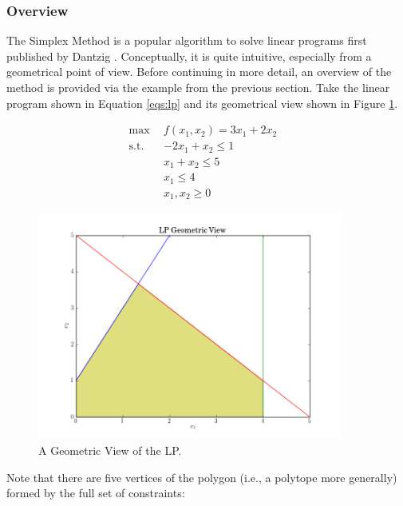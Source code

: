 \subsubsection{Overview}
The Simplex Method is a popular algorithm to solve linear programs first
published by Dantzig \cite{dantzig_maximization_1951}. Conceptually, it is quite
intuitive, especially from a geometrical point of view. Before continuing in
more detail, an overview of the method is provided via the example from the
previous section. Take the linear program shown in Equation \ref{eqs:lp} and its
geometrical view shown in Figure \ref{fig:geometric}.

\begin{subequations}\label{eqs:lp}
  \begin{align}
    \max \:\: & 
    f(x_1, x_2) = 3 x_1 + 2 x_2
    & \label{eqs:lp_obj} \\
    \text{s.t.} \:\: &
    -2 x_1 + x_2 \leq 1 \\
    &
    x_1 + x_2 \leq 5 
    & \label{eqs:lp_sup} \\
    &
    x_1 \leq 4
    &\label{eqs:lp_x1} \\
    &
    x_1, x_2 \geq 0
    &\label{eqs:lp_x2}
  \end{align}
\end{subequations}

\begin{figure}[H]
  \begin{center}
    \includegraphics[height=7.5cm]{./chapters/litreview/plots/geometric.png}
  \caption{A Geometric View of the LP.}
  \label{fig:geometric}
  \end{center}
\end{figure}

Note that there are five vertices of the polygon (i.e., a polytope more
generally) formed by the full set of constraints:


